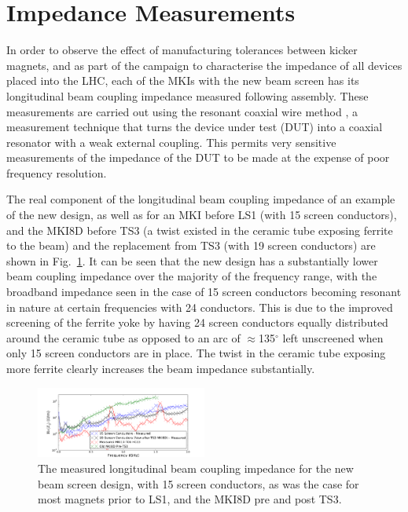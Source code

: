 \documentclass[a4paper,
              ]{jacow}
\begin{document}
\section{Impedance Measurements}

In order to observe the effect of manufacturing tolerances between kicker magnets, and as part of the campaign to characterise the impedance of all devices placed into the LHC, each of the MKIs with the new beam screen has its longitudinal beam coupling impedance measured following assembly. These measurements are carried out using the resonant coaxial wire method \cite{DayThesis}, a measurement technique that turns the device under test (DUT) into a coaxial resonator with a weak external coupling. This permits very sensitive measurements of the impedance of the DUT to be made at the expense of poor frequency resolution.

The real component of the longitudinal beam coupling impedance of an example of the new design, as well as for an MKI before LS1 (with 15 screen conductors), and the MKI8D before TS3 (a twist existed in the ceramic tube exposing ferrite to the beam) and the replacement from TS3 (with 19 screen conductors) are shown in Fig.~\ref{fig:Imp241915}. It can be seen that the new design has a substantially lower beam coupling impedance over the majority of the frequency range, with the broadband impedance seen in the case of 15 screen conductors becoming resonant in nature at certain frequencies with 24 conductors. This is due to the improved screening of the ferrite yoke by having 24 screen conductors equally distributed around the ceramic tube as opposed to an arc of $\approx$135$^{\circ}$ left unscreened when only 15 screen conductors are in place. The twist in the ceramic tube exposing more ferrite clearly increases the beam impedance substantially.

\begin{figure}
\includegraphics[width=0.5\textwidth]{TUPRI030f3.pdf}
\caption{The measured longitudinal beam coupling impedance for the new beam screen design, with 15 screen conductors, as was the case for most magnets prior to LS1, and the MKI8D pre and post TS3.}
\label{fig:Imp241915}
\end{figure}
\end{document}
